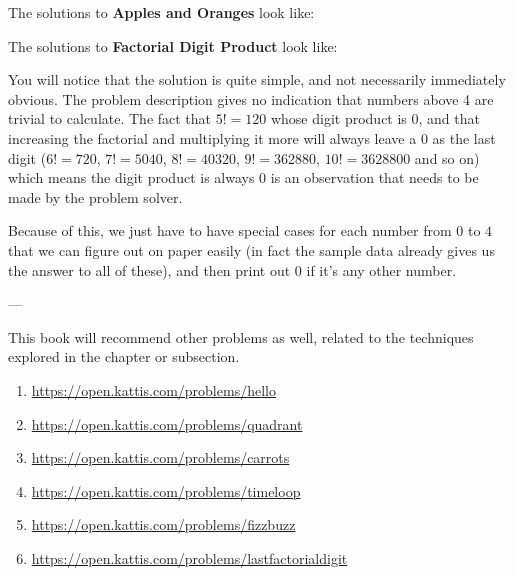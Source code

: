 The solutions to \textbf{Apples and Oranges} look like:


The solutions to \textbf{Factorial Digit Product} look like:


You will notice that the solution is quite simple, and not necessarily immediately obvious. The problem description gives no indication that numbers above 4 are trivial to calculate. The fact that $5! = 120$ whose digit product is $0$, and that increasing the factorial and multiplying it more will always leave a $0$ as the last digit ($6! = 720$, $7! = 5040$, $8! = 40320$, $9! = 362880$, $10! = 3628800$ and so on) which means the digit product is always $0$ is an observation that needs to be made by the problem solver.

Because of this, we just have to have special cases for each number from $0$ to $4$ that we can figure out on paper easily (in fact the sample data already gives us the answer to all of these), and then print out $0$ if it's any other number.

---

This book will recommend other problems as well, related to the techniques explored in the chapter or subsection.

\begin{enumerate}
\item \url{https://open.kattis.com/problems/hello}
\item \url{https://open.kattis.com/problems/quadrant}
\item \url{https://open.kattis.com/problems/carrots}
\item \url{https://open.kattis.com/problems/timeloop}
\item \url{https://open.kattis.com/problems/fizzbuzz}
\item \url{https://open.kattis.com/problems/lastfactorialdigit}
\end{enumerate}
